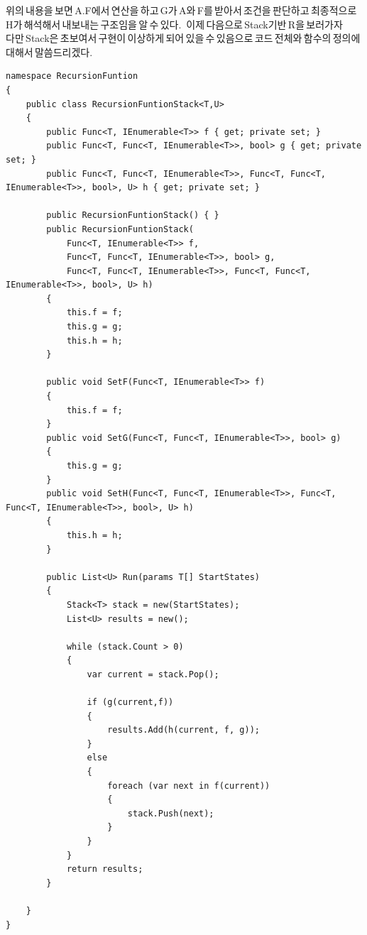 \documentclass{article}
\begin{document}
위의\,내용을\,보면\,A.F에서\,연산을\,하고\,G가\,A와\,F를\,받아서\,조건을\,판단하고\,최종적으로\,H가\,해석해서\,내보내는\,구조임을\,알\,수\,있다.\,
이제\,다음으로\,Stack기반\,R을\,보러가자\\
다만\,Stack은\,초보여서\,구현이\,이상하게\,되어\,있을\,수\,있음으로\,코드\,전체와\,함수의\,정의에\,대해서\,말씀드리겠다.
\\
\newline
\begin{lstlisting}[caption={재귀\,함수\,R의\,Stack버전}]
namespace RecursionFuntion
{
    public class RecursionFuntionStack<T,U>
    {
        public Func<T, IEnumerable<T>> f { get; private set; }
        public Func<T, Func<T, IEnumerable<T>>, bool> g { get; private set; }
        public Func<T, Func<T, IEnumerable<T>>, Func<T, Func<T, IEnumerable<T>>, bool>, U> h { get; private set; }

        public RecursionFuntionStack() { }
        public RecursionFuntionStack(
            Func<T, IEnumerable<T>> f,
            Func<T, Func<T, IEnumerable<T>>, bool> g,
            Func<T, Func<T, IEnumerable<T>>, Func<T, Func<T, IEnumerable<T>>, bool>, U> h)
        {
            this.f = f;
            this.g = g;
            this.h = h;
        }

        public void SetF(Func<T, IEnumerable<T>> f)
        {
            this.f = f;
        }
        public void SetG(Func<T, Func<T, IEnumerable<T>>, bool> g)
        {
            this.g = g;
        }
        public void SetH(Func<T, Func<T, IEnumerable<T>>, Func<T, Func<T, IEnumerable<T>>, bool>, U> h)
        {
            this.h = h;
        }

        public List<U> Run(params T[] StartStates)
        {
            Stack<T> stack = new(StartStates);
            List<U> results = new();

            while (stack.Count > 0)
            {
                var current = stack.Pop();

                if (g(current,f))
                {
                    results.Add(h(current, f, g));
                }
                else
                {
                    foreach (var next in f(current))
                    {
                        stack.Push(next);
                    }
                }
            }
            return results;
        }

    }
}
\end{lstlisting}
\end{document}
